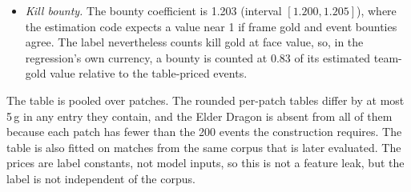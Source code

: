 \begin{itemize}
\item \emph{Kill bounty.} The bounty coefficient is 1.203 (interval $[1.200, 1.205]$), where the
  estimation code expects a value near 1 if frame gold and event bounties agree. The label
  nevertheless counts kill gold at face value, so, in the regression's own currency, a bounty is
  counted at 0.83 of its estimated team-gold value relative to the table-priced events.
\end{itemize}
The table is pooled over patches. The rounded per-patch tables differ by at most 5\,g in any
entry they contain, and the Elder Dragon is absent from all of them because each patch has fewer
than the 200 events the construction requires.
The table is also fitted on matches from the same corpus that is later evaluated. The prices
are label constants, not model inputs, so this is not a feature leak, but the label is not
independent of the corpus.

